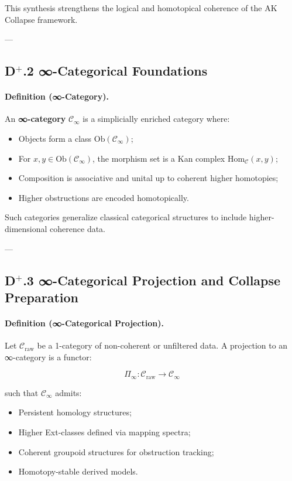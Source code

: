 \documentclass[11pt]{article}
\begin{document}
This synthesis strengthens the logical and homotopical coherence of the AK Collapse framework.

---

\subsection*{D$^{+}$.2 ∞-Categorical Foundations}

\paragraph{Definition (∞-Category).}

An \textbf{∞-category} $\mathcal{C}_\infty$ is a simplicially enriched category where:

\begin{itemize}
    \item Objects form a class $\mathrm{Ob}(\mathcal{C}_\infty)$;
    \item For $x, y \in \mathrm{Ob}(\mathcal{C}_\infty)$, the morphism set is a Kan complex $\mathrm{Hom}_\mathcal{C}(x, y)$;
    \item Composition is associative and unital up to coherent higher homotopies;
    \item Higher obstructions are encoded homotopically.
\end{itemize}

Such categories generalize classical categorical structures to include higher-dimensional coherence data.

---

\subsection*{D$^{+}$.3 ∞-Categorical Projection and Collapse Preparation}

\paragraph{Definition (∞-Categorical Projection).}

Let $\mathcal{C}_{\mathrm{raw}}$ be a 1-category of non-coherent or unfiltered data. A projection to an ∞-category is a functor:

\[
\Pi_\infty : \mathcal{C}_{\mathrm{raw}} \to \mathcal{C}_\infty
\]

such that $\mathcal{C}_\infty$ admits:

\begin{itemize}
    \item Persistent homology structures;
    \item Higher Ext-classes defined via mapping spectra;
    \item Coherent groupoid structures for obstruction tracking;
    \item Homotopy-stable derived models.
\end{itemize}
\end{document}
